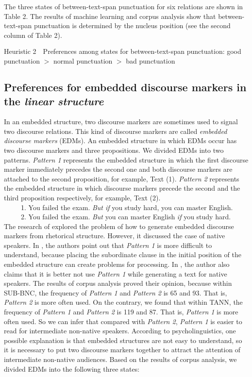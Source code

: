 \documentclass[english]{jnlp_1.2.0}
\begin{document}
The three states of between-text-span punctuation for six relations 
are shown in Table 2. The results of machine learning and corpus analysis
show that between-text-span punctuation is determined by the nucleus position
(see the second column of Table 2).

\textsf{Heuristic 2}~~Preferences among states for between-text-span punctuation: good punctuation $>$ normal punctuation $>$ bad punctuation


\subsection{Preferences for embedded discourse markers in the \textit{linear structure}}

In an embedded structure, two discourse markers are sometimes used 
to signal two discourse relations. This kind of discourse markers 
are called \textit{embedded discourse markers} (EDMs). An embedded 
structure in which EDMs occur has two discourse markers 
and three propositions. We divided EDMs into two patterns. \textit{Pattern 1} 
represents the embedded structure in which the 
first discourse marker immediately precedes the second one and 
both discourse markers are attached to the second proposition, 
for example, Text (1). \textit{Pattern 2} represents the embedded 
structure in which discourse markers precede the second and the 
third proposition respectively, for example, Text (2). 
~\\
~~~~~1. You failed the exam. \textit{But if} you study hard, you can master English.\\
~~~~~2. You failed the exam. \textit{But} you can master English \textit{if} you study hard.
~\\  
The research of \cite{Power99} explored the problem of how to 
generate embedded discourse markers from rhetorical structure. 
However, it discussed the case of native speakers. 
In \cite{Biber99}, the authors point out 
that \textit{Pattern 1} is more difficult to understand,
because placing the subordinate clause in the initial position of the
embedded structure can create problems for processing. In \cite{Williams03},
the author also claims that it is better not use \textit{Pattern 1} while 
generating a text for native speakers. The results of corpus analysis 
proved their opinion, because within SUB-BNC, the frequency of 
\textit{Pattern 1} and \textit{Pattern 2} is 65 and 93. That is, 
\textit{Pattern 2} is more often used. On the contrary, we found 
that within TANN, the frequency of \textit{Pattern 1} and 
\textit{Pattern 2} is 119 and 87. That is, \textit{Pattern 1}
is more often used. So we can infer that compared 
with \textit{Pattern 2}, \textit{Pattern 1} is easier to read 
for intermediate non-native speakers. According to psycholinguistics, 
one possible explanation is that embedded structures are not easy 
to understand, so it is necessary to put two discourse markers 
together to attract the attention of intermediate non-native audiences. 
Based on the results of corpus analysis, we divided EDMs into the 
following three states:
\end{document}
